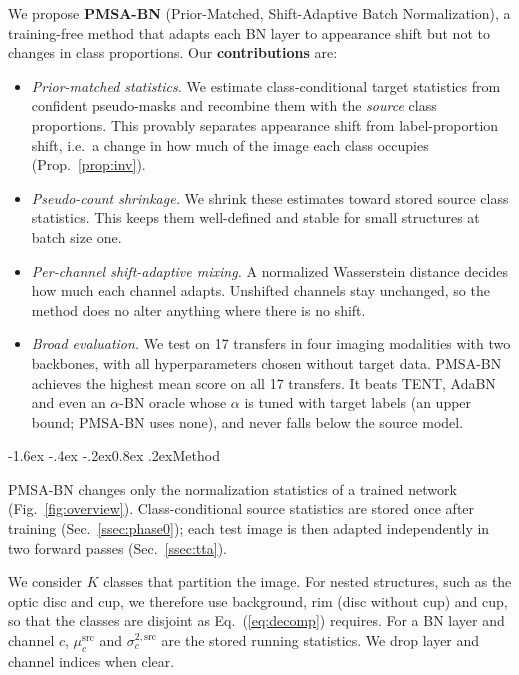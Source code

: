 \documentclass{article}
\makeatletter
\renewcommand\section{\@startsection{section}{1}{\z@}%
  {-1.6ex \@plus -.4ex \@minus -.2ex}{0.8ex \@plus .2ex}{\normalfont}}
\newcommand{\src}{\mathrm{src}}
\makeatother
\begin{document}
We propose \textbf{PMSA-BN} (Prior-Matched, Shift-Adaptive Batch Normalization), a training-free method that adapts each BN layer to appearance shift but not to changes in class proportions. Our \textbf{contributions} are:
\begin{itemize}
\item \emph{Prior-matched statistics.} We estimate class-conditional target statistics from confident pseudo-masks and recombine them with the
  \emph{source} class proportions. This provably separates appearance shift from label-proportion shift, i.e.\ a change in how much of the image each class occupies (Prop.~\ref{prop:inv}).
\item \emph{Pseudo-count shrinkage.} We shrink these estimates toward stored source class statistics. This keeps them well-defined and stable for small structures at batch size one.
\item \emph{Per-channel shift-adaptive mixing.} A normalized Wasserstein distance decides how much each channel adapts. Unshifted channels stay
  unchanged, so the method does no alter anything where there is no shift.
\item \emph{Broad evaluation.} We test on 17 transfers in four imaging modalities with two backbones, with all hyperparameters chosen without target data. PMSA-BN achieves the highest mean score on all 17 transfers. It beats TENT, AdaBN and even an $\alpha$-BN oracle whose $\alpha$ is tuned with target labels (an upper bound; PMSA-BN uses none), and never falls below the source model.
\end{itemize}

\section{Method}
\label{sec:method}

PMSA-BN changes only the normalization statistics of a trained network (Fig.~\ref{fig:overview}). Class-conditional source statistics are stored once after training (Sec.~\ref{ssec:phase0}); each test image is then adapted independently in two forward passes (Sec.~\ref{ssec:tta}).

We consider $K$ classes that partition the image. %
For nested structures, such as the optic disc and cup, we therefore use background, rim (disc without cup) and cup, so that the classes are disjoint as Eq.~(\ref{eq:decomp}) requires. For a BN layer and channel $c$, $\mu^{\src}_c$ and $\sigma^{2,\src}_c$ are the stored running statistics. We drop layer and channel indices when clear.
\end{document}
